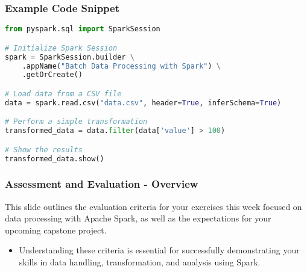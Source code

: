 \documentclass[aspectratio=169]{beamer}
\begin{document}
\begin{frame}[fragile]
    \frametitle{Example Code Snippet}
    \begin{lstlisting}[language=Python]
from pyspark.sql import SparkSession

# Initialize Spark Session
spark = SparkSession.builder \
    .appName("Batch Data Processing with Spark") \
    .getOrCreate()

# Load data from a CSV file
data = spark.read.csv("data.csv", header=True, inferSchema=True)

# Perform a simple transformation
transformed_data = data.filter(data['value'] > 100)

# Show the results
transformed_data.show()
    \end{lstlisting}
\end{frame}

\begin{frame}[fragile]
    \frametitle{Assessment and Evaluation - Overview}
    This slide outlines the evaluation criteria for your exercises this week focused on data processing with Apache Spark, as well as the expectations for your upcoming capstone project. 
    \begin{itemize}
        \item Understanding these criteria is essential for successfully demonstrating your skills in data handling, transformation, and analysis using Spark.
    \end{itemize}
\end{frame}
\end{document}
